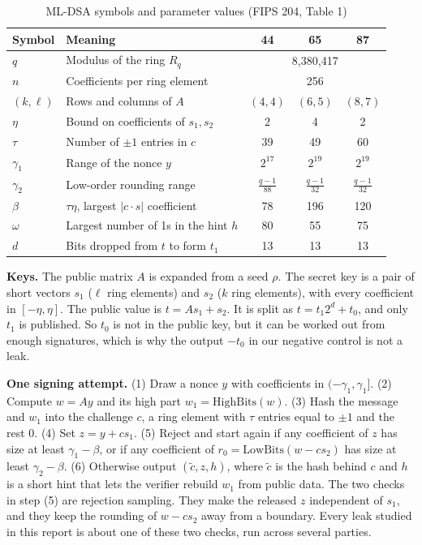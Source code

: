 \documentclass[10pt,conference,a4paper]{IEEEtran}
\newcommand{\HB}{\mathrm{HighBits}}
\newcommand{\LB}{\mathrm{LowBits}}
\begin{document}
\begin{table}[t]
\caption{ML-DSA symbols and parameter values (FIPS 204, Table 1)}\label{tab:appnotation}
\centering\footnotesize
\begin{tabular}{@{}p{0.7cm}p{3.2cm}ccc@{}}
\toprule
Symbol & Meaning & 44 & 65 & 87\\
\midrule
$q$ & Modulus of the ring $R_q$ & \multicolumn{3}{c}{8{,}380{,}417}\\
$n$ & Coefficients per ring element & \multicolumn{3}{c}{256}\\
$(k,\ell)$ & Rows and columns of $A$ & $(4,4)$ & $(6,5)$ & $(8,7)$\\
$\eta$ & Bound on coefficients of $s_1,s_2$ & 2 & 4 & 2\\
$\tau$ & Number of $\pm1$ entries in $c$ & 39 & 49 & 60\\
$\gamma_1$ & Range of the nonce $y$ & $2^{17}$ & $2^{19}$ & $2^{19}$\\
$\gamma_2$ & Low-order rounding range & $\frac{q-1}{88}$ & $\frac{q-1}{32}$ & $\frac{q-1}{32}$\\
$\beta$ & $\tau\eta$, largest $|c\cdot s|$ coefficient & 78 & 196 & 120\\
$\omega$ & Largest number of 1s in the hint $h$ & 80 & 55 & 75\\
$d$ & Bits dropped from $t$ to form $t_1$ & 13 & 13 & 13\\
\bottomrule
\end{tabular}
\end{table}

\textbf{Keys.} The public matrix $A$ is expanded from a seed $\rho$. The secret key is a pair of short vectors $s_1$ ($\ell$
ring elements) and $s_2$ ($k$ ring elements), with every coefficient in $[-\eta,\eta]$. The public value is
$t=A s_1+s_2$. It is split as $t=t_1 2^d+t_0$, and only $t_1$ is published. So $t_0$ is not in the public key, but it can
be worked out from enough signatures, which is why the output $-t_0$ in our negative control is not a leak.

\textbf{One signing attempt.} (1) Draw a nonce $y$ with coefficients in $(-\gamma_1,\gamma_1]$. (2) Compute $w=Ay$ and its
high part $w_1=\HB(w)$. (3) Hash the message and $w_1$ into the challenge $c$, a ring element with $\tau$ entries equal to
$\pm1$ and the rest 0. (4) Set $z=y+c s_1$. (5) Reject and start again if any coefficient of $z$ has size at least
$\gamma_1-\beta$, or if any coefficient of $r_0=\LB(w-c s_2)$ has size at least $\gamma_2-\beta$. (6) Otherwise output
$(\tilde c,z,h)$, where $\tilde c$ is the hash behind $c$ and $h$ is a short hint that lets the verifier rebuild $w_1$ from
public data. The two checks in step (5) are rejection sampling. They make the released $z$ independent of $s_1$, and they
keep the rounding of $w-c s_2$ away from a boundary. Every leak studied in this report is about one of these two checks,
run across several parties.
\end{document}
